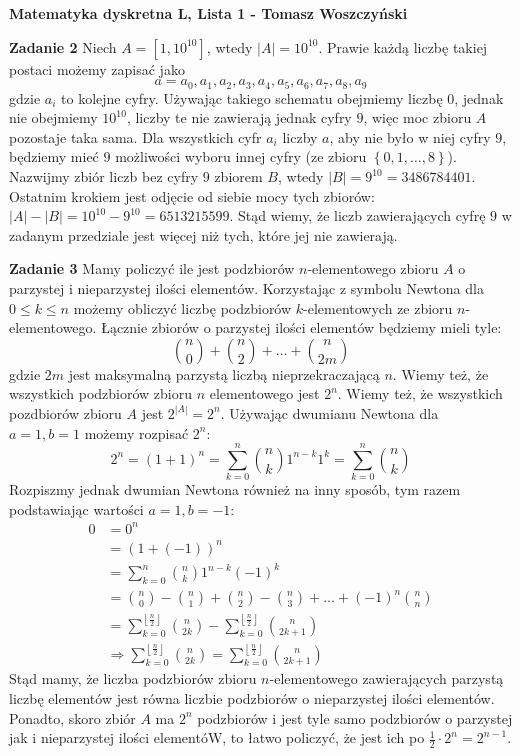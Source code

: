 \documentclass[a4paper,12pt]{article}
\newcommand{\floor}[1]{\left\lfloor #1 \right\rfloor}
\newcommand{\set}[1]{\left \{ #1 \right \}}
\begin{document}
\noindent \textbf{Matematyka dyskretna L, Lista 1 - Tomasz Woszczyński}\newline

\noindent \newline \textbf{Zadanie 2} \newline
Niech $A = \left[ 1, 10^{10} \right]$, wtedy $|A| = 10^{10}$. Prawie każdą liczbę takiej postaci możemy zapisać jako 
$$a = a_0, a_1, a_2, a_3, a_4, a_5, a_6, a_7, a_8, a_9 $$
gdzie $a_i$ to kolejne cyfry. Używając takiego schematu obejmiemy liczbę $0$, jednak nie obejmiemy $10^{10}$, liczby te nie zawierają jednak cyfry $9$, więc moc zbioru $A$ pozostaje taka sama. Dla wszystkich cyfr $a_i$ liczby $a$, aby nie było w niej cyfry $9$, będziemy mieć $9$ możliwości wyboru innej cyfry (ze zbioru $\set{0,1, \ldots, 8}$). Nazwijmy zbiór liczb bez cyfry $9$ zbiorem $B$, wtedy $|B| = 9^{10} = 3486784401$. Ostatnim krokiem jest odjęcie od siebie mocy tych zbiorów: $|A|-|B| = 10^{10} - 9^{10} = 6513215599$. Stąd wiemy, że liczb zawierających cyfrę $9$ w zadanym przedziale jest więcej niż tych, które jej nie zawierają.

\noindent \newline \textbf{Zadanie 3} \newline
Mamy policzyć ile jest podzbiorów $n$-elementowego zbioru $A$ o parzystej i nieparzystej ilości elementów. Korzystając z symbolu Newtona dla $0 \leq k \leq n$ możemy obliczyć liczbę podzbiorów $k$-elementowych ze zbioru $n$-elementowego. Łącznie zbiorów o parzystej ilości elementów będziemy mieli tyle:
$$\binom{n}{0} + \binom{n}{2} + \ldots + \binom{n}{2m}$$
gdzie $2m$ jest maksymalną parzystą liczbą nieprzekraczającą $n$. Wiemy też, że wszystkich podzbiorów zbioru $n$ elementowego jest $2^n$. Wiemy też, że wszystkich pozdbiorów zbioru $A$ jest $2^{|A|}=2^n$. Używając dwumianu Newtona dla $a=1, b=1$ możemy rozpisać $2^n$:
$$2^n = (1+1)^n  = \sum\limits_{k=0}^{n} \binom{n}{k} 1^{n-k}1^{k} = \sum\limits_{k=0}^{n} \binom{n}{k}$$
\noindent Rozpiszmy jednak dwumian Newtona również na inny sposób, tym razem podstawiając wartości $a=1, b=-1$:
$$
\begin{aligned}
0 	&= 0^n \\
  	&= (1 + (-1))^{n}	\\
	&= \sum\limits_{k=0}^{n} \binom{n}{k} 1^{n-k} (-1)^{k}	\\
	&= \binom{n}{0} - \binom{n}{1} + \binom{n}{2} - \binom{n}{3} + \ldots + (-1)^n \binom{n}{n}	\\
	&= \sum\limits_{k=0}^{\floor{\frac{n}{2}}} \binom{n}{2k} - \sum\limits_{k=0}^{\floor{\frac{n}{2}}} \binom{n}{2k+1} \\
	&\Rightarrow \sum\limits_{k=0}^{\floor{\frac{n}{2}}} \binom{n}{2k} = \sum\limits_{k=0}^{\floor{\frac{n}{2}}} \binom{n}{2k+1}
\end{aligned}
$$
Stąd mamy, że liczba podzbiorów zbioru $n$-elementowego zawierających parzystą liczbę elementów jest równa liczbie podzbiorów o nieparzystej ilości elementów. Ponadto, skoro zbiór $A$ ma $2^n$ podzbiorów i jest tyle samo podzbiorów o parzystej jak i nieparzystej ilości elementóW, to łatwo policzyć, że jest ich po $\frac{1}{2}\cdot 2^n = 2^{n-1}$.
\end{document}
